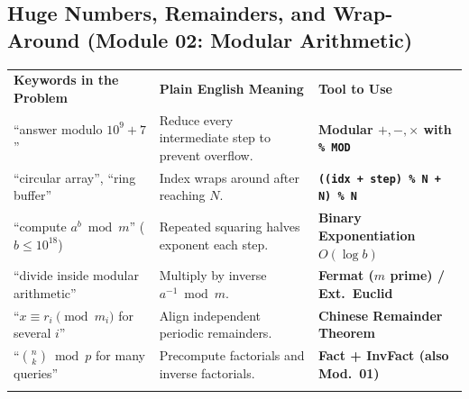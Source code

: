 \documentclass[11pt,a4paper]{article}
\begin{document}
\subsection{Huge Numbers, Remainders, and Wrap-Around (Module 02: Modular Arithmetic)}
\begingroup\footnotesize{}
\begin{tabularx}{\textwidth}{>{\raggedright\arraybackslash}p{4.4cm} >{\raggedright\arraybackslash}X >{\raggedright\arraybackslash\bfseries}p{4.0cm}}
\arrayrulecolor{primaryblue}\toprule[1.1pt]
\rowcolor{primaryblue!10}
\textcolor{primaryblue}{\textbf{Keywords in the Problem}} & \textcolor{primaryblue}{\textbf{Plain English Meaning}} & \textcolor{primaryblue}{\textbf{Tool to Use}} \\
\arrayrulecolor{codeframe}\midrule[0.6pt]
``answer modulo $10^9 + 7$'' & Reduce every intermediate step to prevent overflow. & Modular $+, -, \times$ with \texttt{\% MOD} \\
``circular array'', ``ring buffer'' & Index wraps around after reaching $N$. & \texttt{((idx + step) \% N + N) \% N} \\
``compute $a^b \bmod m$'' ($b \le 10^{18}$) & Repeated squaring halves exponent each step. & Binary Exponentiation $O(\log b)$ \\
``divide inside modular arithmetic'' & Multiply by inverse $a^{-1} \bmod m$. & Fermat ($m$ prime) / Ext.\ Euclid \\
``$x \equiv r_i \pmod{m_i}$ for several $i$'' & Align independent periodic remainders. & Chinese Remainder Theorem \\
``$\binom{n}{k} \bmod p$ for many queries'' & Precompute factorials and inverse factorials. & Fact + InvFact (also Mod.\ 01) \\
\arrayrulecolor{primaryblue}\bottomrule[1.1pt]
\end{tabularx}\endgroup
\end{document}
